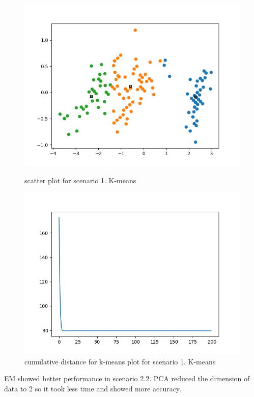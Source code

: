 \documentclass[a4paper]{article}
\begin{document}
\begin{figure}[h!]
\begin{minipage}[t]{6.5cm}
              \includegraphics[width=1.0\textwidth]{pca_k_1_1.png}
              \caption{scatter plot for scenario 1. K-means}
            \end{minipage}
            \hspace{2cm}
            \begin{minipage}[t]{6.5cm}
              \includegraphics[width=1.0\textwidth]{pca_k_1_2.png}
              \caption{cumulative distance for k-means plot for scenario 1. K-means}
            \end{minipage}
          \end{figure}

        EM showed better performance in scenario 2.2. PCA reduced the dimension of data to 2 so it took less time and showed more accuracy.
\end{document}
